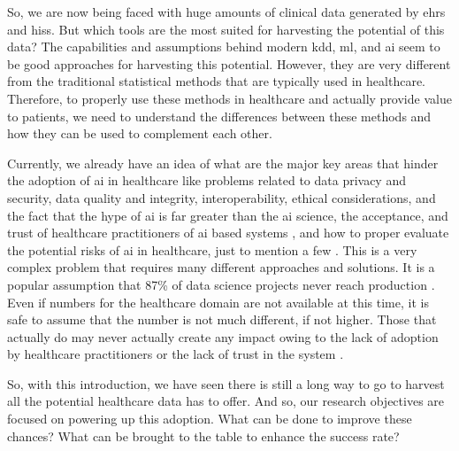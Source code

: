 So, we are now being faced with huge amounts of clinical data generated by \acp{ehr} and \acp{his}. But which tools are the most suited for harvesting the potential of this data? 
The capabilities and assumptions behind modern \ac{kdd}, \ac{ml}, and \ac{ai} seem to be good approaches for harvesting this potential. However, they are very different from the traditional statistical methods that are typically used in healthcare.
Therefore, to properly use these methods in healthcare and actually provide value to patients, we need to understand the differences between these methods and how they can be used to complement each other.

Currently, we already have an idea of what are the major key areas that hinder the adoption of \ac{ai} in healthcare like problems related to data privacy and security, data quality and integrity, interoperability, ethical considerations, and the fact that the hype of \ac{ai} is far greater than the \ac{ai} science, the acceptance, and trust of healthcare practitioners of \ac{ai} based systems \cite{muhiyaddinImpactClinicalDecision2020,kilsdonkFactorsInfluencingImplementation2017}, and how to proper evaluate the potential risks of \ac{ai} in healthcare, just to mention a few \cite{topolHighperformanceMedicineConvergence2019a}.
This is a very complex problem that requires many different approaches and solutions. It is a popular assumption that 87\% of data science projects never reach production \cite{Why87Data2019}. Even if numbers for the healthcare domain are not available at this time, it is safe to assume that the number is not much different, if not higher. Those that actually do may never actually create any impact owing to the lack of adoption by healthcare practitioners or the lack of trust in the system \cite{walkerModelGuidedDecisionMakingThromboprophylaxis2023}.

So, with this introduction, we have seen there is still a long way to go to harvest all the potential healthcare data has to offer. And so, our research objectives are focused on powering up this adoption. What can be done to improve these chances? What can be brought to the table to enhance the success rate?






